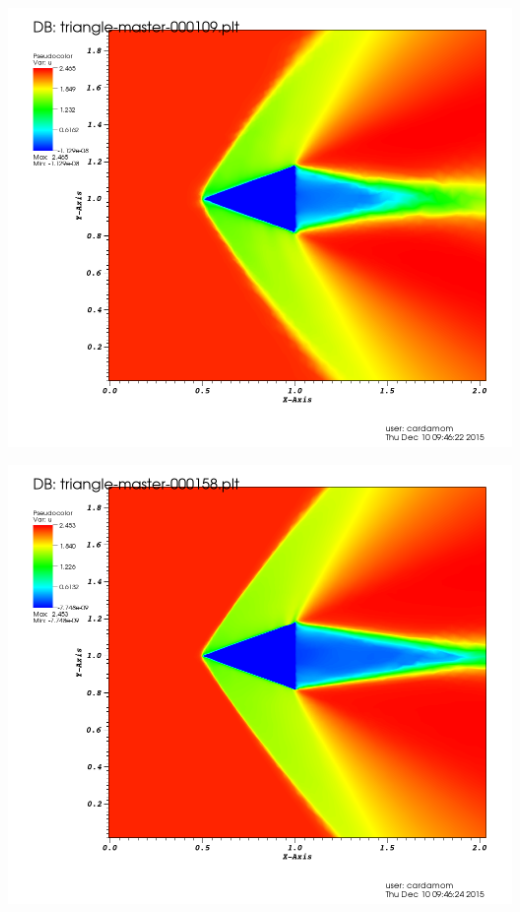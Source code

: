 \newpage

\begingroup
	\begin{minipage}[t]{.5\linewidth}
		\centering
		\includegraphics[scale=.2]{Bordeaux/figures/AdapPhysique/Plot4bI0A.png}
	\end{minipage}
	\hfill
	\begin{minipage}[t]{.5\linewidth}
		\centering
		\includegraphics[scale=.2]{Bordeaux/figures/AdapPhysique/Plot4bI1A.png}
	\end{minipage}
